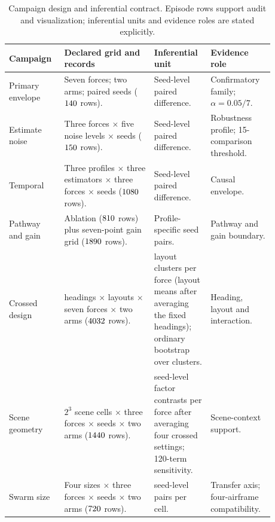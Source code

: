 \begin{table}[!htbp]
\centering
\small
\renewcommand{\arraystretch}{1.10}
\caption{Campaign design and inferential contract. Episode rows support audit and
visualization; inferential units and evidence roles are stated explicitly.}
\label{tab:campaign-contract}
\begin{tabular}{@{}>{\raggedright\arraybackslash}p{0.18\linewidth}
>{\raggedright\arraybackslash}p{0.31\linewidth}
>{\raggedright\arraybackslash}p{0.18\linewidth}
>{\raggedright\arraybackslash}p{0.21\linewidth}@{}}
\toprule
Campaign & Declared grid and records & Inferential unit & Evidence role \\
\midrule
Primary envelope & Seven forces; two arms; \NSeeds{} paired seeds
($140{}$ rows). & Seed-level paired difference. & Confirmatory family;
$\alpha=0.05/7$. \\
Estimate noise & Three forces $\times$ five noise levels $\times$ \NSeeds{} seeds
($150{}$ rows). & Seed-level paired difference. & Robustness profile;
15-comparison threshold. \\
Temporal & Three profiles $\times$ three estimators $\times$ three forces
$\times$ \NTemporalSeeds{} seeds ($1080{}$ rows). & Seed-level
paired difference. & Causal envelope. \\
Pathway and gain & Ablation ($810{}$ rows) plus seven-point gain
grid ($1890{}$ rows). & Profile-specific seed pairs. & Pathway and
gain boundary. \\
Crossed design & \NAssignedHeadings{} headings $\times$ \NScenes{} layouts
$\times$ seven forces $\times$ two arms ($4032{}$ rows). &
\NScenes{} layout clusters per force (layout means after averaging the fixed
headings); ordinary bootstrap over clusters. & Heading, layout and interaction. \\
Scene geometry & $2^3$ scene cells $\times$ three forces $\times$ \NGeometrySeeds{}
seeds $\times$ two arms ($1440{}$ rows). & 30 seed-level factor
contrasts per force after averaging four crossed settings; 120-term sensitivity. &
Scene-context support. \\
Swarm size & Four sizes $\times$ three forces $\times$ \NScaleSeeds{} seeds
$\times$ two arms ($720{}$ rows). & 30 seed-level pairs per cell. &
Transfer axis; four-airframe compatibility. \\
\bottomrule
\end{tabular}
\end{table}
